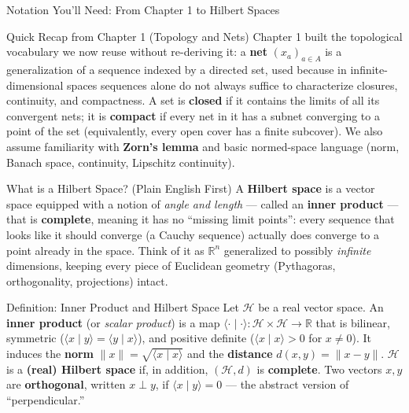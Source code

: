 \documentclass[aspectratio=169,10pt]{beamer}
\newcommand{\R}{\mathbb{R}}
\newcommand{\Hil}{\mathcal{H}}
\newcommand{\ip}[2]{\langle #1 \mid #2 \rangle}
\begin{document}
\begin{frame}[allowframebreaks]{Notation You'll Need: From Chapter 1 to Hilbert Spaces}

  \begin{block}{Quick Recap from Chapter 1 (Topology and Nets)}
    Chapter 1 built the topological vocabulary we now reuse without
    re-deriving it: a \textbf{net} $(x_a)_{a \in A}$ is a generalization of a
    sequence indexed by a directed set, used because in infinite-dimensional
    spaces sequences alone do not always suffice to characterize closures,
    continuity, and compactness. A set is \textbf{closed} if it contains the
    limits of all its convergent nets; it is \textbf{compact} if every net in
    it has a subnet converging to a point of the set (equivalently, every
    open cover has a finite subcover). We also assume familiarity with
    \textbf{Zorn's lemma} and basic normed-space language (norm, Banach
    space, continuity, Lipschitz continuity).
  \end{block}

  \begin{alertblock}{What is a Hilbert Space? (Plain English First)}
    A \textbf{Hilbert space} is a vector space equipped with a notion of
    \emph{angle and length} --- called an \textbf{inner product} --- that is
    \textbf{complete}, meaning it has no ``missing limit points'': every
    sequence that looks like it should converge (a Cauchy sequence) actually
    does converge to a point already in the space. Think of it as
    $\R^n$ generalized to possibly \emph{infinite} dimensions, keeping every
    piece of Euclidean geometry (Pythagoras, orthogonality, projections)
    intact.
  \end{alertblock}

  \framebreak

  \begin{block}{Definition: Inner Product and Hilbert Space}
    Let $\Hil$ be a real vector space. An \textbf{inner product} (or
    \emph{scalar product}) is a map $\ip{\cdot}{\cdot} : \Hil \times \Hil \to
    \R$ that is bilinear, symmetric ($\ip{x}{y} = \ip{y}{x}$), and positive
    definite ($\ip{x}{x} > 0$ for $x \ne 0$). It induces the \textbf{norm}
    $\|x\| = \sqrt{\ip{x}{x}}$ and the \textbf{distance} $d(x,y) = \|x-y\|$.
    $\Hil$ is a \textbf{(real) Hilbert space} if, in addition, $(\Hil, d)$ is
    \textbf{complete}. Two vectors $x, y$ are \textbf{orthogonal}, written
    $x \perp y$, if $\ip{x}{y} = 0$ --- the abstract version of ``perpendicular.''
  \end{block}


\end{frame}
\end{document}
